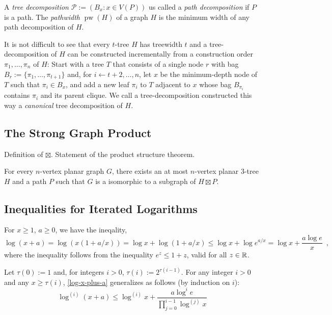 \documentclass[kpfonts]{patmorin}
\DeclareMathOperator{\pw}{pw}
\begin{document}
A \emph{tree decomposition }$\mathcal{P}:=(B_x:x\in V(P))$ us called a \emph{path decomposition} if $P$ is a path. The \emph{pathwidth} $\pw(H)$ of a graph $H$ is the minimum width of any path decomposition of $H$.

It is not difficult to see that every $t$-tree $H$ has treewidth $t$ and a tree-decomposition of $H$ can be constructed incrementally from a construction order $\pi_1,\ldots,\pi_n$ of $H$: Start with a tree $T$ that consists of a single node $r$ with bag $B_r:=\{\pi_1,\ldots,\pi_{t+1}\}$ and, for $i\gets t+2,\ldots,n$, let $x$ be the minimum-depth node of $T$ such that $\pi_i\in B_x$, and add a new leaf $\pi_i$ to $T$ adjacent to $x$ whose bag $B_{\pi_i}$ contains $\pi_i$ and its parent clique.  We call a tree-decomposition constructed this way a \emph{canonical} tree decomposition of $H$.

\subsection{The Strong Graph Product}

Definition of $\boxtimes$.  Statement of the product structure theorem.


\begin{thm}\cite{dujmovic.joret.ea:planar}\label{product}
    For every $n$-vertex planar graph $G$, there exists an at most $n$-vertex planar 3-tree $H$ and a path $P$ such that $G$ is a isomorphic to a subgraph of $H\boxtimes P$.
\end{thm}

\subsection{Inequalities for Iterated Logarithms}

For $x\ge 1$, $a\ge 0$, we have the ineqality,
\begin{equation}
    \log (x+a) = \log (x(1+a/x)) = \log x + \log(1+a/x) \le \log x + \log e^{a/x} = \log x + \frac{a\log e}{x} \enspace , \label{log-x-plus-a}
\end{equation}
where the inequality follows from the inequality $e^z \le 1+z$, valid for all $z\in\mathbb{R}$.

Let $\tau(0):=1$ and, for integers $i>0$, $\tau(i):=2^{\tau(i-1)}$. For any integer $i>0$ and any $x\ge \tau(i)$, \cref{log-x-plus-a} generalizes as follows (by induction on $i$):
\begin{equation}
    \log^{(i)}(x+a) \le \log^{(i)} x + \frac{a\log^i e}{\prod_{j=0}^{i-1}\log^{(j)} x} \label{logi-x-plus-a}
\end{equation}
\end{document}
